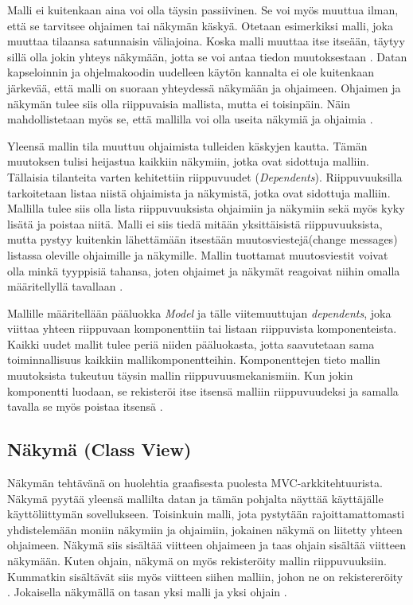 \documentclass[finnish,utf8,nonumbib,palatino,kandi]{gradu2}
\begin{document}
Malli ei kuitenkaan aina voi olla täysin passiivinen. Se voi myös muuttua ilman, että se tarvitsee ohjaimen tai näkymän käskyä. Otetaan esimerkiksi malli, joka muuttaa tilaansa satunnaisin väliajoina. Koska malli muuttaa itse itseään, täytyy sillä olla jokin yhteys näkymään, jotta se voi antaa tiedon muutoksestaan \cite{Burbeck}. Datan kapseloinnin ja ohjelmakoodin uudelleen käytön kannalta ei ole kuitenkaan järkevää, että malli on suoraan yhteydessä näkymään ja ohjaimeen. Ohjaimen ja näkymän tulee siis olla riippuvaisia mallista, mutta ei toisinpäin. Näin mahdollistetaan myös se, että mallilla voi olla useita näkymiä ja ohjaimia \cite{Krasner[s. 27]}.

Yleensä mallin tila muuttuu ohjaimista tulleiden käskyjen kautta. Tämän muutoksen tulisi heijastua kaikkiin näkymiin, jotka ovat sidottuja malliin. Tällaisia tilanteita varten kehitettiin riippuvuudet (\emph{Dependents}).
Riippuvuuksilla tarkoitetaan listaa niistä ohjaimista ja näkymistä, jotka ovat sidottuja malliin. Mallilla tulee siis olla lista riippuvuuksista ohjaimiin ja näkymiin sekä myös kyky lisätä ja poistaa niitä. Malli ei siis tiedä mitään yksittäisistä riippuvuuksista, mutta pystyy kuitenkin lähettämään itsestään muutosviestejä(change messages) listassa oleville ohjaimille ja näkymille. Mallin tuottamat muutosviestit voivat olla minkä tyyppisiä tahansa, joten ohjaimet ja näkymät reagoivat niihin omalla määritellyllä tavallaan  \cite{Krasner[s. 27]}. 

Mallille määritellään pääluokka \emph{Model} ja tälle viitemuuttujan \emph{dependents}, joka viittaa yhteen riippuvaan komponenttiin tai listaan riippuvista komponenteista. Kaikki uudet mallit tulee periä niiden pääluokasta, jotta saavutetaan sama toiminnallisuus kaikkiin mallikomponentteihin. Komponenttejen tieto mallin muutoksista tukeutuu täysin mallin riippuvuusmekanismiin. Kun jokin komponentti luodaan, se rekisteröi itse itsensä malliin riippuvuudeksi ja samalla tavalla se myös poistaa itsensä \cite{Burbeck}.

\subsection{Näkymä (Class View)}
Näkymän tehtävänä on huolehtia graafisesta puolesta MVC-arkkitehtuurista. Näkymä pyytää yleensä mallilta datan ja tämän pohjalta näyttää käyttäjälle käyttöliittymän sovellukseen. Toisinkuin malli, jota pystytään rajoittamattomasti yhdistelemään moniin näkymiin ja ohjaimiin, jokainen näkymä on liitetty yhteen ohjaimeen.  Näkymä siis sisältää viitteen ohjaimeen ja taas ohjain sisältää viitteen näkymään. Kuten ohjain, näkymä on myös rekisteröity mallin riippuvuuksiin. Kummatkin sisältävät siis myös viitteen siihen malliin, johon ne on rekistereröity \cite{Burbeck}. Jokaisella näkymällä on tasan yksi malli ja yksi ohjain \cite{Krasner[s.29]}.  
\end{document}

